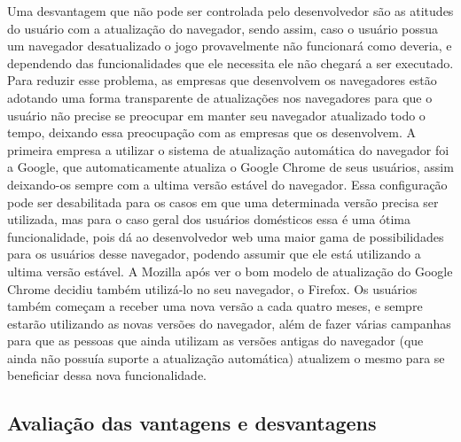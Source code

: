 Uma desvantagem que não pode ser controlada pelo desenvolvedor são as
atitudes do usuário com a atualização do navegador, sendo assim, caso
o usuário possua um navegador desatualizado o jogo provavelmente não
funcionará como deveria, e dependendo das funcionalidades que ele
necessita ele não chegará a ser executado. Para reduzir esse problema,
as empresas que desenvolvem os navegadores estão adotando uma forma
transparente de atualizações nos navegadores para que o usuário não
precise se preocupar em manter seu navegador atualizado todo o tempo,
deixando essa preocupação com as empresas que os desenvolvem.
A primeira empresa a utilizar o sistema de atualização automática do
navegador foi a Google, que automaticamente atualiza o Google Chrome
de seus usuários, assim deixando-os sempre com a ultima versão estável
do navegador. Essa configuração pode ser desabilitada para os casos em
que uma determinada versão precisa ser utilizada, mas para o caso
geral dos usuários domésticos essa é uma ótima funcionalidade, pois dá
ao desenvolvedor web uma maior gama de possibilidades para os usuários
desse navegador, podendo assumir que ele está utilizando a ultima
versão estável.
A Mozilla após ver o bom modelo de atualização do Google Chrome
decidiu também utilizá-lo no seu navegador, o Firefox. Os usuários
também começam a receber uma nova versão a cada quatro meses, e sempre
estarão utilizando as novas versões do navegador, além de fazer várias
campanhas para que as pessoas que ainda utilizam as versões antigas do navegador (que ainda
não possuía suporte a atualização automática) atualizem o mesmo para
se beneficiar dessa nova funcionalidade.

\subsection{Avaliação das vantagens e desvantagens}

